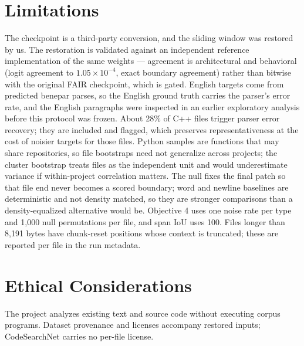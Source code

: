 \section*{Limitations}
The checkpoint is a third-party conversion, and the sliding window was restored by us. The restoration is validated against an independent reference implementation of the same weights --- agreement is architectural and behavioral (logit agreement to $1.05\times10^{-4}$, exact boundary agreement) rather than bitwise with the original FAIR checkpoint, which is gated. English targets come from predicted benepar parses, so the English ground truth carries the parser's error rate, and the English paragraphs were inspected in an earlier exploratory analysis before this protocol was frozen. About 28\% of C++ files trigger parser error recovery; they are included and flagged, which preserves representativeness at the cost of noisier targets for those files. Python samples are functions that may share repositories, so file bootstraps need not generalize across projects; the cluster bootstrap treats files as the independent unit and would underestimate variance if within-project correlation matters. The null fixes the final patch so that file end never becomes a scored boundary; word and newline baselines are deterministic and not density matched, so they are stronger comparisons than a density-equalized alternative would be. Objective 4 uses one noise rate per type and 1{,}000 null permutations per file, and span IoU uses 100. Files longer than 8{,}191 bytes have chunk-reset positions whose context is truncated; these are reported per file in the run metadata.

\section*{Ethical Considerations}
The project analyzes existing text and source code without executing corpus programs. Dataset provenance and licenses accompany restored inputs; CodeSearchNet carries no per-file license.



